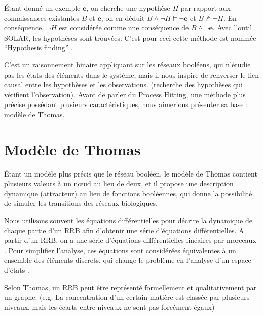 \documentclass[11pt]{report}
\theoremstyle{definition}
\begin{document}
\'Etant donn\'e un exemple $\mathbf{e}$, on cherche une hypoth\`ese $H$ par rapport aux connaissances existantes $B$ et $\mathbf{e}$, on en d\'eduit $B\land\lnot H\models\lnot \mathbf{e}$ et $B \not\models\lnot H$. En cons\'equence, $\lnot H$ est consid\'er\'ee comme une cons\'equence de $B\land\lnot \mathbf{e}$. Avec l'outil SOLAR, les hypoth\`eses sont trouv\'ees. C'est pour ceci cette m\'ethode est nomm\'ee ``Hypothesis finding'' \citep{Yamamoto2014,Nabeshima2010}.

C'est un raisonnement binaire appliquant sur les r\'eseaux bool\'eens, qui n'\'etudie pas les \'etats des \'el\'ements dans le syst\`eme, mais il nous inspire de renverser le lien causal entre les hypoth\`eses et les observations. (recherche des hypoth\`eses qui v\'erifient l'observation). Avant de parler du Process Hitting, une m\'ethode plus pr\'ecise poss\'edant plusieurs caract\'eristiques, nous aimerions pr\'esenter sa base : mod\`ele de Thomas.
\section{Mod\`ele de Thomas}
\'Etant un mod\`ele plus pr\'ecis que le r\'eseau bool\'een, le mod\`ele de Thomas contient plusieurs valeurs \`a un n\oe ud au lieu de deux, et il propose une description dynamique (attracteur) au lieu de fonctions bool\'eennes, qui donne la possibilit\'e de simuler les transitions des r\'eseaux biologiques.

Nous utilisons souvent les \'equations diff\'erentielles pour d\'ecrire la dynamique de chaque partie d'un RRB afin d'obtenir une s\'erie d'\'equations diff\'erentielles. A partir d'un RRB, on a une s\'erie d'\'equations diff\'erentielles lin\'eaires par morceaux \citep{filippov1960differential}. Pour simplifier l'analyse, ces \'equations sont consid\'er\'ees \'equivalentes \`a un ensemble des \'el\'ements discrets, qui change le probl\`eme en l'analyse d'un espace d'\'etats \citep{Glass1973}.

Selon Thomas, un RRB peut \^etre repr\'esent\'e formellement et qualitativement par un graphe. (e.g. La concentration d'un certain mati\`ere est class\'ee par plusieurs niveaux, mais les \'ecarts entre niveaux ne sont pas forc\'ement \'egaux)
\end{document}
